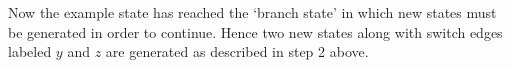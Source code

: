 \documentclass[envcountsame,runningheads]{llncs}
\begin{document}
%

\clearpage
Now the example state has reached the `branch state' in which new states must be generated in order to continue. Hence two new states along with switch edges labeled $y$ and $z$ are generated as described in step 2 above.
\end{document}
